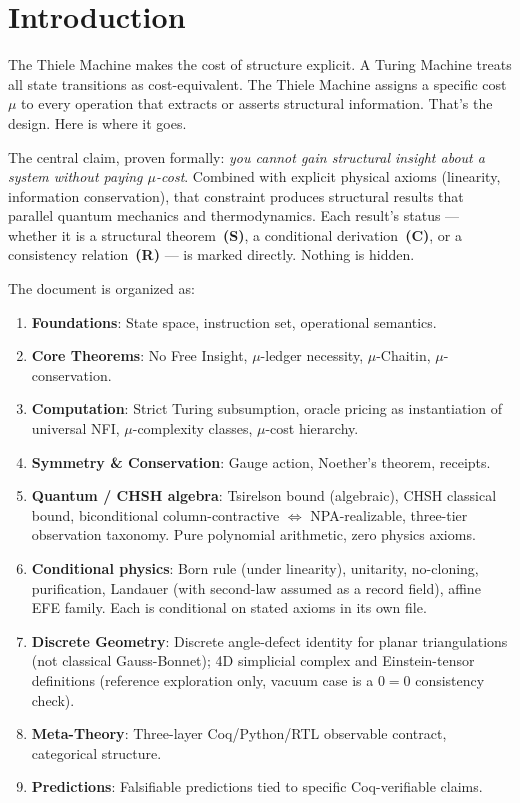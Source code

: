 \documentclass[11pt, a4paper]{report}
\theoremstyle{definition}
\theoremstyle{plain}
\begin{document}
\chapter{Introduction}
The Thiele Machine makes the cost of structure explicit. A Turing Machine treats all state transitions as cost-equivalent. The Thiele Machine assigns a specific cost $\mu$ to every operation that extracts or asserts structural information. That's the design. Here is where it goes.

The central claim, proven formally: \emph{you cannot gain structural insight about a system without paying $\mu$-cost}. Combined with explicit physical axioms (linearity, information conservation), that constraint produces structural results that parallel quantum mechanics and thermodynamics. Each result's status --- whether it is a structural theorem~\textbf{(S)}, a conditional derivation~\textbf{(C)}, or a consistency relation~\textbf{(R)} --- is marked directly. Nothing is hidden.

The document is organized as:
\begin{enumerate}
    \item \textbf{Foundations}: State space, instruction set, operational semantics.
    \item \textbf{Core Theorems}: No Free Insight, $\mu$-ledger necessity, $\mu$-Chaitin, $\mu$-conservation.
    \item \textbf{Computation}: Strict Turing subsumption, oracle pricing as instantiation of universal NFI, $\mu$-complexity classes, $\mu$-cost hierarchy.
    \item \textbf{Symmetry \& Conservation}: Gauge action, Noether's theorem, receipts.
    \item \textbf{Quantum / CHSH algebra}: Tsirelson bound (algebraic), CHSH classical bound, biconditional column-contractive $\iff$ NPA-realizable, three-tier observation taxonomy. Pure polynomial arithmetic, zero physics axioms.
    \item \textbf{Conditional physics}: Born rule (under linearity), unitarity, no-cloning, purification, Landauer (with second-law assumed as a record field), affine EFE family. Each is conditional on stated axioms in its own file.
    \item \textbf{Discrete Geometry}: Discrete angle-defect identity for planar triangulations (not classical Gauss-Bonnet); 4D simplicial complex and Einstein-tensor definitions (reference exploration only, vacuum case is a $0=0$ consistency check).
    \item \textbf{Meta-Theory}: Three-layer Coq/Python/RTL observable contract, categorical structure.
    \item \textbf{Predictions}: Falsifiable predictions tied to specific Coq-verifiable claims.
\end{enumerate}
\end{document}
